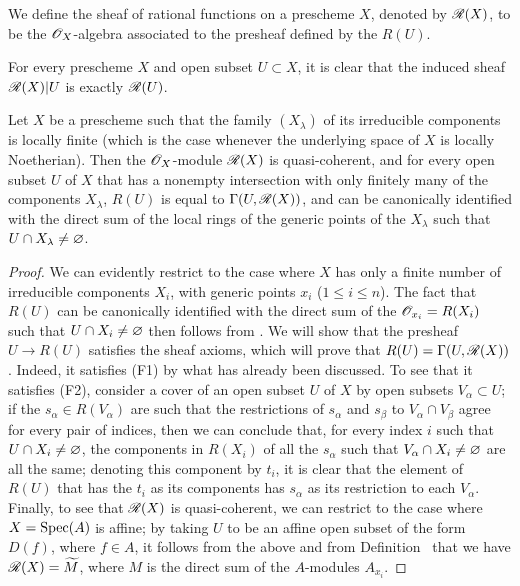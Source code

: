 \begin{definition}[7.3.2]
\label{I.7.3.2}
We
define the sheaf of rational functions on a prescheme $X$, denoted by $\mathscr{R}(X)$, to be the $\mathscr{O}_X$-algebra associated to the presheaf defined by the $R(U)$.
\end{definition}

For every prescheme $X$ and open subset $U\subset X$, it is clear that the induced sheaf $\mathscr{R}(X)|U$ is exactly $\mathscr{R}(U)$.

\begin{proposition}[7.3.3]
\label{I.7.3.3}
Let $X$ be a prescheme such that the family $(X_\lambda)$ of its irreducible components is locally finite (which is the case whenever the underlying space of $X$ is locally Noetherian).
Then the $\mathscr{O}_X$-module $\mathscr{R}(X)$ is quasi-coherent, and for every open subset $U$ of $X$ that has a nonempty intersection with only finitely many of the components $X_\lambda$, $R(U)$ is equal to $\Gamma(U,\mathscr{R}(X))$, and can be canonically identified with the direct sum of the local rings of the generic points of the $X_\lambda$ such that $U\cap X_\lambda\neq\varnothing$.
\end{proposition}

\begin{proof}
We can evidently restrict to the case where $X$ has only a finite number of irreducible components $X_i$, with generic points $x_i$ ($1\leq i\leq n$).
The fact that $R(U)$ can be canonically identified with the direct sum of the $\mathscr{O}_{x_i}=R(X_i)$ such that $U\cap X_i\neq\varnothing$ then follows from .
We will show that the presheaf $U\to R(U)$ satisfies the sheaf axioms, which will prove that $R(U)=\Gamma(U,\mathscr{R}(X))$.
Indeed, it satisfies (F1) by what has already been discussed.
To see that it satisfies (F2), consider a cover of an open subset $U$ of $X$ by open subsets $V_\alpha\subset U$; if the $s_\alpha\in R(V_\alpha)$ are such that the restrictions of $s_\alpha$ and $s_\beta$ to $V_\alpha\cap V_\beta$ agree for every pair of indices, then we can conclude that, for every index $i$ such that $U\cap X_i\neq\varnothing$, the components in $R(X_i)$ of all the $s_\alpha$ such that $V_\alpha\cap X_i\neq\varnothing$ are all the same; denoting this component by $t_i$, it is clear that the element of $R(U)$ that has the $t_i$ as its components has $s_\alpha$ as its restriction to each $V_\alpha$.
Finally, to see that $\mathscr{R}(X)$ is quasi-coherent, we can restrict to the case where $X=\operatorname{Spec}(A)$ is affine; by taking $U$ to be an affine open subset of the form $D(f)$, where $f\in A$, it follows from the above and from Definition~ that we have $\mathscr{R}(X)=\widetilde{M}$, where $M$ is the direct sum of the $A$-modules $A_{x_i}$.
\end{proof}

